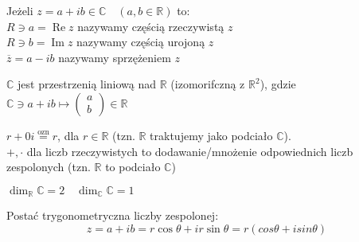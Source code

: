 \begin{minipage}[c]{0.65\textwidth}
\begin{df}
    Jeżeli $ z = a + ib \in \mathbb{C} \quad (a,b \in \mathbb{R})$ to: \\ 
    $R \ni a = \operatorname{Re} z $ nazywamy częścią rzeczywistą $z$ \\ 
    $R \ni b = \operatorname{Im} z$ nazywamy częścią urojoną $z$ \\ 
    $\overline{z} = a - ib$ nazywamy sprzężeniem $z$
\end{df} 
\end{minipage}%
\begin{minipage}[c]{0.3\textwidth}
\end{minipage}
\begin{ft} 
    $\mathbb{C}$ jest przestrzenią liniową nad $\mathbb{R}$ (izomorifczną z $\mathbb{R}^2$), gdzie 
    $\mathbb{C} \ni a + ib \mapsto \begin{pmatrix} a \\ b \end{pmatrix} \in \mathbb{R}$
\end{ft}
\begin{uw} 
    $r + 0i \overset{\text{ozn}}{=} r$, dla $r \in \mathbb{R}$ (tzn. $\mathbb{R}$ traktujemy jako 
    podciało $\mathbb{C}$). \\ 
    $+,\cdot$ dla liczb rzeczywistych to dodawanie/mnożenie odpowiednich liczb zespolonych
    (tzn. $\mathbb{R}$ to podciało $\mathbb{C}$)
\end{uw} 
\begin{uw} $\dim_\mathbb{R} \mathbb{C} = 2 \quad \dim_\mathbb{C} \mathbb{C} = 1$ \end{uw}
\begin{minipage}[c]{0.65\textwidth}
    \begin{df} Postać trygonometryczna liczby zespolonej: 
        \[ z = a+ib = r\cos \theta + ir\sin \theta = r(cos\theta + i sin \theta) \] \end{df} 
\end{minipage}
